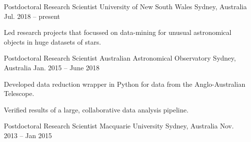 

\begin{cventries}

  \cventry
    {Postdoctoral Research Scientist} %
    {University of New South Wales} %
    {Sydney, Australia} %
    {Jul. 2018 -- present} %
    {
      \begin{cvitems} %
        \item {Led research projects that focussed on data-mining for unusual astronomical objects in huge datasets of stars.}
        \item {}
      \end{cvitems}
    }
    
  \cventry
    {Postdoctoral Research Scientist} %
    {Australian Astronomical Observatory} %
    {Sydney, Australia} %
    {Jan. 2015 -- June 2018} %
    {
      \begin{cvitems} %
        \item {Developed data reduction wrapper in Python for data from the Anglo-Australian Telescope.}
        \item {Verified results of a large, collaborative data analysis pipeline.}
      \end{cvitems}
    }
    
  \cventry
    {Postdoctoral Research Scientist} %
    {Macquarie University} %
    {Sydney, Australia} %
    {Nov. 2013 -- Jan 2015} %
    {
      \begin{cvitems} %
        \item {}
      \end{cvitems}
    }


\end{cventries}
